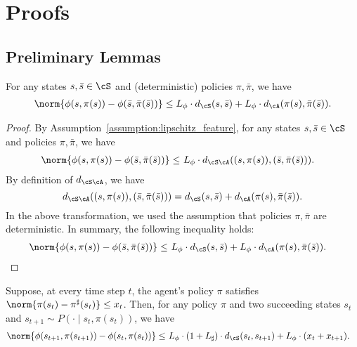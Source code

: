 \section{Proofs}
\label{appendix:proof}

\subsection{Preliminary Lemmas}

\begin{lemma}
\label{lemma:7}
For any states $s, \bar{s} \in \cS$ and (deterministic) policies $\pi, \bar{\pi}$, we have
%
\begin{alignat*}{2}
    \norm{\phi(s, \pi(s)) - \phi(\bar{s}, \bar{\pi}(\bar{s}))}
    \le L_\phi \cdot d_\cS(s, \bar{s}) + L_\phi \cdot d_\cA(\pi(s), \bar{\pi}(\bar{s})).
\end{alignat*}
\end{lemma}

\smallskip
\begin{proof}
By Assumption~\ref{assumption:lipschitz_feature}, for any states $s, \bar{s} \in \cS$ and policies $\pi, \bar{\pi}$, we have
%
\begin{alignat*}{2}
    \norm{\phi(s, \pi(s)) - \phi(\bar{s}, \bar{\pi}(\bar{s}))}
    \le &\ L_\phi \cdot d_{\cS\cA}((s, \pi(s)), (\bar{s}, \bar{\pi}(\bar{s}))).
\end{alignat*}
%
By definition of $d_{\cS \cA}$, we have
%
\[
    d_{\cS\cA}((s, \pi(s)), (\bar{s}, \bar{\pi}(\bar{s}))) = d_\cS(s, \bar{s}) + d_\cA(\pi(s), \bar{\pi}(\bar{s})).
\]
%
In the above transformation, we used the assumption that policies $\pi, \bar{\pi}$ are deterministic.
%
In summary, the following inequality holds:
%
\begin{alignat*}{2}
    \norm{\phi(s, \pi(s)) - \phi(\bar{s}, \bar{\pi}(\bar{s}))}
    \le &\ L_\phi \cdot d_\cS(s, \bar{s}) + L_\phi \cdot d_\cA(\pi(s), \bar{\pi}(\bar{s})).
\end{alignat*}
\end{proof}

\begin{lemma}
    Suppose, at every time step $t$, the agent's policy $\pi$ satisfies $\norm{\pi(s_t) - \pi^\sharp(s_t)} \le x_t$.
    Then, for any policy $\pi$ and two succeeding states $s_t$ and $s_{t+1} \sim P(\cdot \mid s_t, \pi(s_t))$, we have
    \begin{align}
        \label{eq:diff_phi_t_tp1}
        \norm{\phi(s_{t+1}, \pi(s_{t+1})) - \phi(s_t, \pi(s_t))}
        \le &\ L_\phi \cdot (1 + L_\sharp) \cdot d_\cS(s_t, s_{t+1}) + L_\phi \cdot  (x_t + x_{t+1}).
    \end{align}
\end{lemma}

